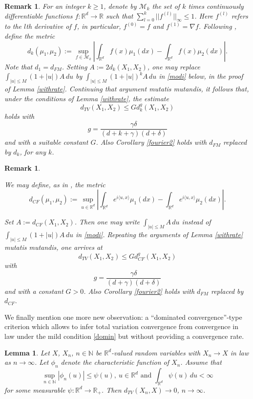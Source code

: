 \documentclass{article}
\newtheorem{lemma}[theorem]{Lemma}
\newtheorem{remark}[theorem]{Remark}
\begin{document}
\begin{remark}\label{DK} {\rm For an integer $k\geq 1$,
denote by $\mathcal{M}_{k}$ the set of $k$ times continuously differentiable functions $f:\mathbb{R}^{d}\to\mathbb{R}$
such that $\sum_{l=0}^{k}||f^{(l)}||_{\infty}\leq 1$. 
Here $f^{(l)}$ refers to the $l$th derivative of $f$, in particular, $f^{(0)}=f$ and $f^{(1)}=\nabla f$. 
Following \cite{bally,bc1}, define the metric 
$$
d_{k}(\mu_{1},\mu_{2}):=\sup_{f\in\mathcal{M}_{k}}\left|\int_{\mathbb{R}^{d}}f(x)\mu_{1}(dx)-\int_{\mathbb{R}^{d}}f(x)\mu_{2}(dx)\right|.
$$
Note that $d_{1}=d_{FM}$. Setting $A:=2d_{k}(X_{1},X_{2})$, one may 
replace $\int_{|u|\leq M} (1+|u|) A\, du$ by $\int_{|u|\leq M} (1+|u|)^{k} A\, du$ in \eqref{modi} below, in the
proof of Lemma \ref{withrate}. Continuing that argument mutatis mutandis,
it follows that, under the conditions of Lemma \ref{withrate}, the estimate
$$
d_{TV}(X_{1},X_{2})\leq G d_{k}^{g}(X_{1},X_{2})	
$$
holds with 
$$
g=\frac{\gamma\delta}{(d+k+\gamma)(d+\delta)}
$$
and with a suitable constant $G$. Also Corollary \ref{fourier2} holds with $d_{FM}$ replaced by
$d_{k}$, for any $k$.}
\end{remark}

\begin{remark}\label{cf}
{\rm We may define, as in \cite{bc2}, the metric
$$
d_{CF}(\mu_{1},\mu_{2}):=\sup_{u\in\mathbb{R}^{d}}\left|\int_{\mathbb{R}^{d}}e^{i\langle u,x\rangle}\mu_{1}(dx)-{}
\int_{\mathbb{R}^{d}}e^{i\langle u,x\rangle}\mu_{2}(dx)\right|.
$$

Set $A:=d_{CF}(X_{1},X_{2})$. Then one may write $\int_{|u|\leq M}  A\, du$ instead of
$\int_{|u|\leq M} (1+|u|) A\, du$ in \eqref{modi}. Repeating the arguments of Lemma \ref{withrate} mutatis mutandis,
one arrives at 
$$
d_{TV}(X_{1},X_{2})\leq G d_{CF}^{g}(X_{1},X_{2})	
$$
with 
$$
g=\frac{\gamma\delta}{(d+\gamma)(d+\delta)}
$$
and with a constant $G>0$. Also Corollary \ref{fourier2} holds with $d_{FM}$ replaced by $d_{CF}$.}
\end{remark}


We finally mention one more new observation: a ``dominated convergence''-type criterion which allows to infer
total variation convergence from convergence in law under the mild condition \eqref{domin} but 
without providing a convergence rate.

\begin{lemma}\label{simple}
Let $X$, $X_{n}$, $n\in\mathbb{N}$ be $\mathbb{R}^{d}$-valued
random variables with $X_{n}\to X$ in law as $n\to\infty$. Let $\phi_{n}$ denote the
characteristic function of $X_{n}$. 
Assume that
\begin{equation}\label{domin}
\sup_{n\in\mathbb{N}}|\phi_{n}(u)|\leq \psi(u),\ u\in\mathbb{R}^{d}\mbox{ and }
\int_{\mathbb{R}^{d}}\psi(u)\, du<\infty
\end{equation}
for some measurable $\psi:\mathbb{R}^{d}\to\mathbb{R}_{+}$. 
Then $d_{TV}(X_{n},X)\to 0$, $n\to\infty$.
\end{lemma}
\end{document}
